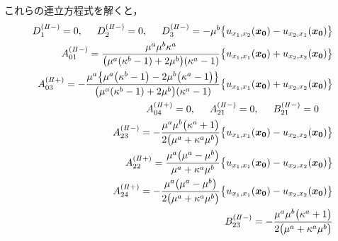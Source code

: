 これらの連立方程式を解くと，
\begin{align}
	D_{1}^{(I\hspace{-.15em}I-)}=0,\hspace{0.5cm}D_{2}^{(I\hspace{-.15em}I-)}=0,
	\hspace{0.5cm}D_{3}^{(I\hspace{-.15em}I-)}=-\mu^{b}\bigl\{u_{x_{1},x_{2}}(\bm{x_{0}})-u_{x_{2},x_{1}}(\bm{x_{0}})\bigr\}&
	\nonumber
	\\
	A_{01}^{(I\hspace{-.15em}I-)}=\frac{\mu^{a}\mu^{b}\kappa^{a}}{\bigl(\mu^{a}(\kappa^{b}-1)+2\mu^{b}\bigr)(\kappa^{a}-1)}
	\bigl\{u_{x_{1},x_{1}}(\bm{x_{0}})+u_{x_{2},x_{2}}(\bm{x_{0}})\bigr\}&
	\nonumber
	\\
	A_{03}^{(I\hspace{-.15em}I+)}=-\frac{\mu^{a}\bigl\{ \mu^{a}\bigl(\kappa^{b}-1\bigr)-2\mu^{b}\bigl(\kappa^{a}-1\bigr)\bigr\}}{\bigl(\mu^{a}(\kappa^{b}-1)+2\mu^{b}\bigr)(\kappa^{a}-1)}
	\bigl\{u_{x_{1},x_{1}}(\bm{x_{0}})+u_{x_{2},x_{2}}(\bm{x_{0}})\bigr\}&
	\nonumber
	\\
	A_{04}^{(I\hspace{-.15em}I+)}=0,\hspace{0.5cm} A_{21}^{(I\hspace{-.15em}I-)}=0,\hspace{0.5cm} B_{21}^{(I\hspace{-.15em}I-)}=0\hspace{0.5cm}&
	\nonumber
	\\
	A_{23}^{(I\hspace{-.15em}I-)}=-\frac{\mu^{a}\mu^{b}\bigl(\kappa^{a}+1\bigr)}{2\bigl(\mu^{a}+\kappa^{a}\mu^{b}\bigr)}
	\bigl\{u_{x_{1},x_{1}}(\bm{x_{0}})-u_{x_{2},x_{2}}(\bm{x_{0}})\bigr\}&
	\nonumber
	\\
	A_{22}^{(I\hspace{-.15em}I+)}=\frac{\mu^{a}\bigl(\mu^{a}-\mu^{b}\bigr)}{\mu^{a}+\kappa^{a}\mu^{b}}
	\bigl\{u_{x_{1},x_{1}}(\bm{x_{0}})-u_{x_{2},x_{2}}(\bm{x_{0}})\bigr\}&
	\nonumber\\
	A_{24}^{(I\hspace{-.15em}I+)}=-\frac{\mu^{a}\bigl(\mu^{a}-\mu^{b}\bigr)}{2\bigl(\mu^{a}+\kappa^{a}\mu^{b}\bigr)}
	\bigl\{u_{x_{1},x_{1}}(\bm{x_{0}})-u_{x_{2},x_{2}}(\bm{x_{0}})\bigr\}&
	\nonumber
	\\
	B_{23}^{(I\hspace{-.15em}I-)}=-\frac{\mu^{a}\mu^{b}\bigl(\kappa^{a}+1\bigr)}{2\bigl(\mu^{a}+\kappa^{a}\mu^{b}\bigr)}

\end{align}
